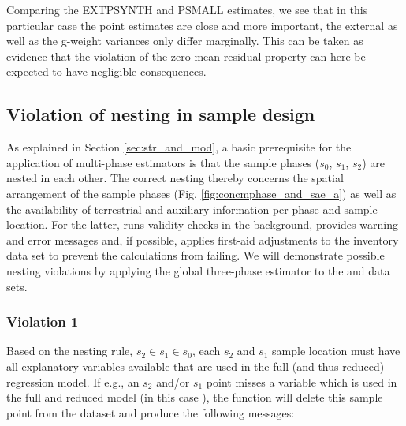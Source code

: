Comparing the EXTPSYNTH and PSMALL estimates, we see that in this particular case the point estimates are close and more important, the external as well as the g-weight variances only differ marginally. This can be taken as evidence that the violation of the zero mean residual property can here be expected to have negligible consequences.

\subsection{Violation of nesting in sample design}

As explained in Section \ref{sec:str_and_mod}, a basic prerequisite for the application of multi-phase estimators is that the sample phases ($s_0$, $s_1$, $s_2$) are nested in each other. The correct nesting thereby concerns the spatial arrangement of the sample phases (Fig. \ref{fig:concmphase_and_sae_a}) as well as the availability of terrestrial and auxiliary information per phase and sample location. For the latter,  runs validity checks in the background, provides warning and error messages and, if possible, applies first-aid adjustments to the inventory data set to prevent the calculations from failing. We will demonstrate possible nesting violations by applying the global three-phase estimator to the  and  data sets.

\subsubsection*{Violation 1}

Based on the nesting rule, $s_2 \in s_1 \in s_0$, each $s_2$ and $s_1$ sample location must have all explanatory variables available that are used in the full (and thus reduced) regression model. If e.g., an $s_2$ and/or $s_1$ point misses a variable which is used in the full and reduced model (in this case ), the function will delete this sample point from the dataset and produce the following messages:  

\begin{small}
\begin{Schunk}
\end{Schunk}
\end{small}

